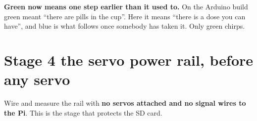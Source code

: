 \documentclass[11pt,a4paper]{article}
\begin{document}
\vspace{1mm}
\begin{notebox}
\textbf{\sffamily Green now means one step earlier than it used to.} On the
Arduino build green meant ``there are pills in the cup''. Here it means ``there
is a dose you can have'', and blue is what follows once somebody has taken it.
Only green chirps.
\end{notebox}

\section{Stage 4 \textemdash{} the servo power rail, before any servo}

Wire and measure the rail with \textbf{no servos attached and no signal wires to
the Pi}. This is the stage that protects the SD card.
\end{document}
